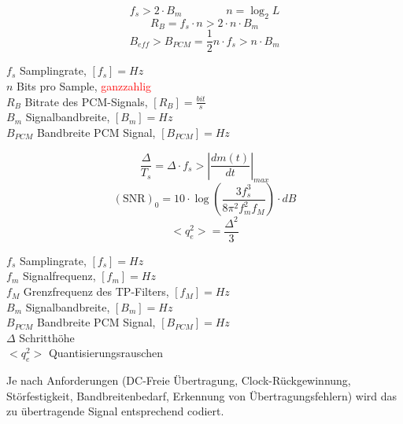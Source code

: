 
\begin{minipage}{9cm}
	$$ f_s > 2 \cdot B_m  \qquad \qquad n = \log_2 L$$ 
	$$ R_B = f_s \cdot n > 2 \cdot n \cdot B_m $$ 
	$$ B_{eff} > B_{PCM} = \frac{1}{2} n \cdot f_s > n \cdot B_m$$
\end{minipage}
\begin{minipage}{9cm}
	$f_s$ Samplingrate, $[f_s] = Hz$ \\
	$n$ Bits pro Sample, \textcolor{red}{ganzzahlig} \\
	$R_B$ Bitrate des PCM-Signals, $[R_B] = \frac{bit}{s}$ \\
	$B_m$ Signalbandbreite, $[B_m] = Hz $ \\
	$B_{PCM}$ Bandbreite PCM Signal, $[B_{PCM}] = Hz $
\end{minipage}


\begin{minipage}{9cm}
$$ \frac{\Delta}{T_s} = \Delta \cdot f_s > \left| \frac{d m(t)}{dt} \right|_{max}$$
$$ (\text{SNR})_0 = 10 \cdot \log\left(\frac{3 f_s^3}{8 \pi^2 f_m^2 f_M}\right) \cdot dB$$ 
$$ <q_e^2> = \frac{\Delta^2}{3} $$ 
\end{minipage}
\begin{minipage}{9cm}
	$f_s$ Samplingrate, $[f_s] = Hz$ \\
	$f_m$ Signalfrequenz, $[f_m] = Hz$ \\
	$f_M$ Grenzfrequenz des TP-Filters, $[f_M] = Hz$ \\
	$B_m$ Signalbandbreite, $[B_m] = Hz $ \\
	$B_{PCM}$ Bandbreite PCM Signal, $[B_{PCM}] = Hz $\\
	$\Delta$ Schritthöhe\\
	$<q_e^2>$ Quantisierungsrauschen \\
	
\end{minipage}

Je nach Anforderungen (DC-Freie Übertragung, Clock-Rückgewinnung, Störfestigkeit,
Bandbreitenbedarf, Erkennung von Übertragungsfehlern) wird das zu übertragende Signal entsprechend
codiert.

